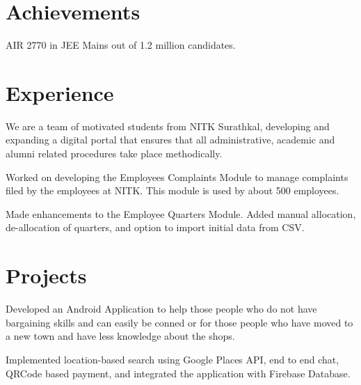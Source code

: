 \documentclass[]{deedy-resume-openfont}
\begin{document}
\begin{minipage}[t]{0.33\textwidth}

\section{Achievements} 
AIR 2770 in JEE Mains out of 1.2 million candidates.\\
\sectionsep

%
%

\end{minipage} 
\hfill
\begin{minipage}[t]{0.66\textwidth} 


\section{Experience}

\vspace{\topsep}
\begin{tightemize}
\item We are a team of motivated students from NITK Surathkal, developing and expanding a digital portal that ensures that all administrative, academic and alumni related procedures take place methodically.\item Worked on developing the Employees Complaints Module to manage complaints filed by the employees at NITK. This module is used by about 500 employees.\item Made enhancements to the Employee Quarters Module. Added manual allocation, de-allocation of quarters, and option to import initial data from CSV.
\end{tightemize}
\sectionsep


\section{Projects}
\begin{tightemize}
\item Developed an Android Application to help those people who do not have bargaining skills and can easily be conned or for those people who have moved to a new town and have less knowledge about the shops.
\item Implemented location-based search using Google Places API, end to end chat, QRCode based payment, and integrated the application with Firebase Database.
\end{tightemize}
\sectionsep


\end{minipage}
\end{document}
